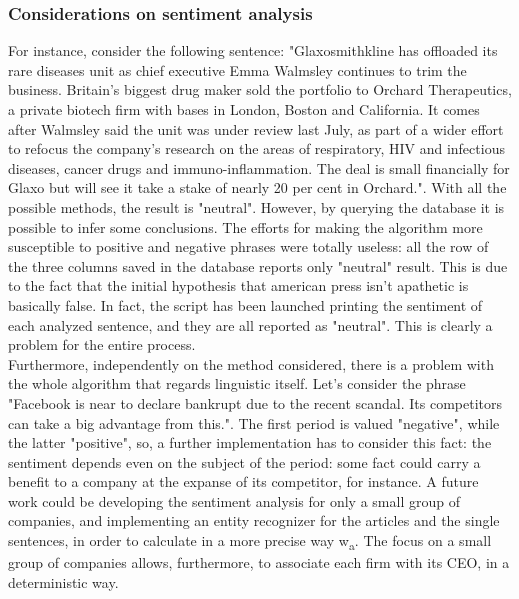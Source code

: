 \subsubsection{Considerations on sentiment analysis}
For instance, consider the following sentence:  "Glaxosmithkline has offloaded its rare diseases unit as chief executive Emma Walmsley continues to trim the business. Britain’s biggest drug maker sold the portfolio to Orchard Therapeutics, a private biotech firm with bases in London, Boston and California. It comes after Walmsley said the unit was under review last July, as part of a wider effort to refocus the company’s research on the areas of respiratory, HIV and infectious diseases, cancer drugs and immuno-inflammation. The deal is small financially for Glaxo but will see it take a stake of nearly 20 per cent in Orchard.". With all the possible methods, the result is "neutral". 
However, by querying the database it is possible to infer some conclusions. The efforts for making the algorithm more susceptible to positive and negative phrases were totally useless: all the row of the three columns saved in the database reports only "neutral" result. This is due to the fact that the initial hypothesis that american press isn't apathetic is basically false. In fact, the script has been launched printing the sentiment of each analyzed sentence, and they are all reported as "neutral". This is clearly a problem for the entire process. \\
Furthermore, independently on the method considered, there is a problem with the whole algorithm that regards linguistic itself. Let's consider the phrase "Facebook is near to declare bankrupt due to the recent scandal. Its competitors can take a big advantage from this.". The first period is valued "negative", while the latter "positive", so, a further implementation has to consider this fact: the sentiment depends even on the subject of the period: some fact could carry a benefit to a company at the expanse of its competitor, for instance. A future work could be developing the sentiment analysis for only a small group of companies, and implementing an entity recognizer for the articles and the single sentences, in order to calculate in a more precise way w\textsubscript{a}. The focus on a small group of companies allows, furthermore, to associate each firm with its CEO, in a deterministic way.  